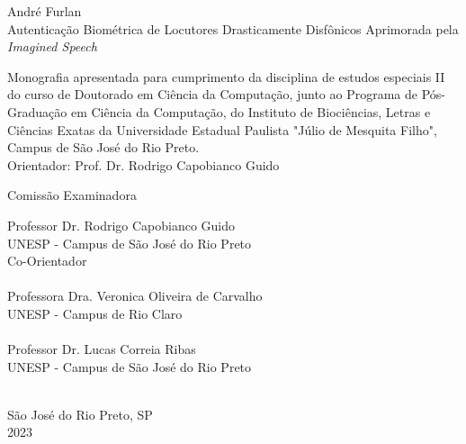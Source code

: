 \documentclass[a4paper,12pt,openright,oneside]{book}
\begin{document}
	\begin{center}
		\vspace{4cm}
		\fontsize{14}{\baselineskip} \selectfont
		\vspace{30.0pt}
		{André Furlan} \\ \vspace{30.0pt}
		{Autenticação Biométrica de Locutores Drasticamente Disfônicos Aprimorada pela \textit{Imagined Speech}} \\ \onehalfspacing \fontsize{14}{\baselineskip} \selectfont
		\par \null
		\begin{flushright}
		\parbox{3.50in}{
			\fontsize{12}{\baselineskip} \selectfont \onehalfspacing
			Monografia apresentada para cumprimento da disciplina de estudos especiais II do curso de Doutorado em Ciência da Computação, junto ao Programa de Pós-Graduação em Ciência da Computação, do Instituto de Biociências, Letras e Ciências Exatas da Universidade Estadual Paulista "Júlio de Mesquita Filho", Campus de São José do Rio Preto. \\ \vspace{1.0pt}
			{Orientador: Prof. Dr. Rodrigo Capobianco Guido } \\ \vspace{1.0pt}
		}
		\end{flushright}
		\fontsize{14}{\baselineskip} \selectfont
		Comissão Examinadora \\  \vspace{1.0pt}
	\end{center}

	\fontsize{14}{\baselineskip} \selectfont
	Professor Dr. Rodrigo Capobianco Guido \\ 
	UNESP - Campus de São José do Rio Preto \\
	Co-Orientador \\\\
	
	Professora Dra. Veronica Oliveira de Carvalho \\ 
	UNESP - Campus de Rio Claro \\\\
	
	Professor Dr. Lucas Correia Ribas \\
	UNESP - Campus de São José do Rio Preto \\\\
	\vspace{3.0cm}

	\begin{center}
		São José do Rio Preto, SP  \\ \vspace{1.0pt}
		2023
	\end{center}
\end{document}
